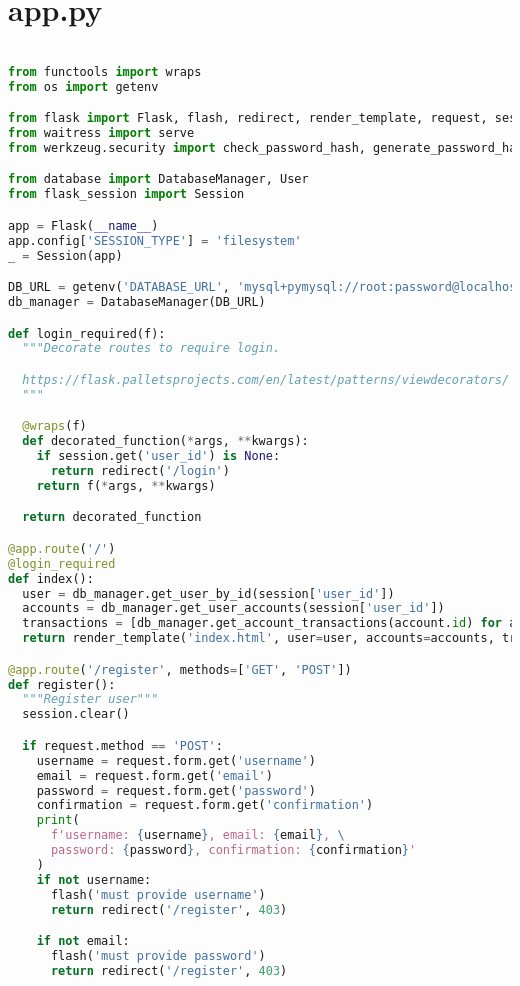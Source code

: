 \section{app.py}
\begin{lstlisting}[language=Python]

from functools import wraps
from os import getenv

from flask import Flask, flash, redirect, render_template, request, session, url_for
from waitress import serve
from werkzeug.security import check_password_hash, generate_password_hash

from database import DatabaseManager, User
from flask_session import Session

app = Flask(__name__)
app.config['SESSION_TYPE'] = 'filesystem'
_ = Session(app)

DB_URL = getenv('DATABASE_URL', 'mysql+pymysql://root:password@localhost/flask_ebank')
db_manager = DatabaseManager(DB_URL)

def login_required(f):
  """Decorate routes to require login.

  https://flask.palletsprojects.com/en/latest/patterns/viewdecorators/
  """

  @wraps(f)
  def decorated_function(*args, **kwargs):
    if session.get('user_id') is None:
      return redirect('/login')
    return f(*args, **kwargs)

  return decorated_function

@app.route('/')
@login_required
def index():
  user = db_manager.get_user_by_id(session['user_id'])
  accounts = db_manager.get_user_accounts(session['user_id'])
  transactions = [db_manager.get_account_transactions(account.id) for account in accounts]
  return render_template('index.html', user=user, accounts=accounts, transactions=transactions)

@app.route('/register', methods=['GET', 'POST'])
def register():
  """Register user"""
  session.clear()

  if request.method == 'POST':
    username = request.form.get('username')
    email = request.form.get('email')
    password = request.form.get('password')
    confirmation = request.form.get('confirmation')
    print(
      f'username: {username}, email: {email}, \
      password: {password}, confirmation: {confirmation}'
    )
    if not username:
      flash('must provide username')
      return redirect('/register', 403)

    if not email:
      flash('must provide password')
      return redirect('/register', 403)


\end{lstlisting}
